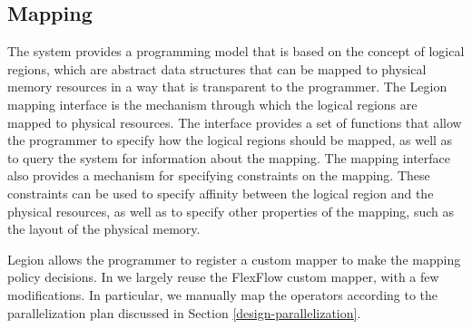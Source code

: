 \subsection{Mapping}
The system provides a programming model that is based on the concept of logical regions, which are abstract data structures that can be mapped to physical memory resources in a way that is transparent to the programmer. The Legion mapping interface is the mechanism through which the logical regions are mapped to physical resources. The interface provides a set of functions that allow the programmer to specify how the logical regions should be mapped, as well as to query the system for information about the mapping. The mapping interface also provides a mechanism for specifying constraints on the mapping. These constraints can be used to specify affinity between the logical region and the physical resources, as well as to specify other properties of the mapping, such as the layout of the physical memory.

Legion allows the programmer to register a custom mapper to make the mapping policy decisions. In \Project we largely reuse the FlexFlow custom mapper, with a few modifications. In particular, we manually map the operators according to the parallelization plan discussed in Section \ref{design-parallelization}.


